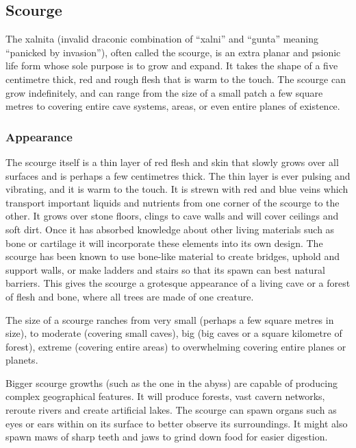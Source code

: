 \subsection{Scourge}
\label{sec:Scourge}

The xalnita (invalid draconic combination of ``xalni'' and ``gunta'' meaning
``panicked by invasion''), often called the scourge, is an extra planar and
psionic life form whose sole purpose is to grow and expand. It takes the shape
of a five centimetre thick, red and rough flesh that is warm to the touch. The
scourge can grow indefinitely, and can range from the size of a small patch a
few square metres to covering entire cave systems, areas, or even entire
planes of existence.

\subsubsection{Appearance}

The scourge itself is a thin layer of red flesh and skin that slowly grows
over all surfaces and is perhaps a few centimetres thick. The thin layer
is ever pulsing and vibrating, and it is warm to the touch. It is strewn with
red and blue veins which transport important liquids and nutrients from one
corner of the scourge to the other. It grows over stone floors, clings to cave
walls and will cover ceilings and soft dirt. Once it has absorbed knowledge
about other living materials such as bone or cartilage it will incorporate
these elements into its own design. The scourge has been known to use
bone-like material to create bridges, uphold and support walls, or make
ladders and stairs so that its spawn can best natural barriers. This gives
the scourge a grotesque appearance of a living cave or a forest of flesh and
bone, where all trees are made of one creature.

The size of a scourge ranches from very small (perhaps a few square metres in
size), to moderate (covering small caves), big (big caves or a square kilometre
of forest), extreme (covering entire areas) to overwhelming covering entire
planes or planets.

Bigger scourge growths (such as the one in the abyss) are capable of producing
complex geographical features. It will produce forests, vast cavern networks,
reroute rivers and create artificial lakes. The scourge can spawn organs such
as eyes or ears within on its surface to better observe its surroundings. It
might also spawn maws of sharp teeth and jaws to grind down food for easier
digestion.

